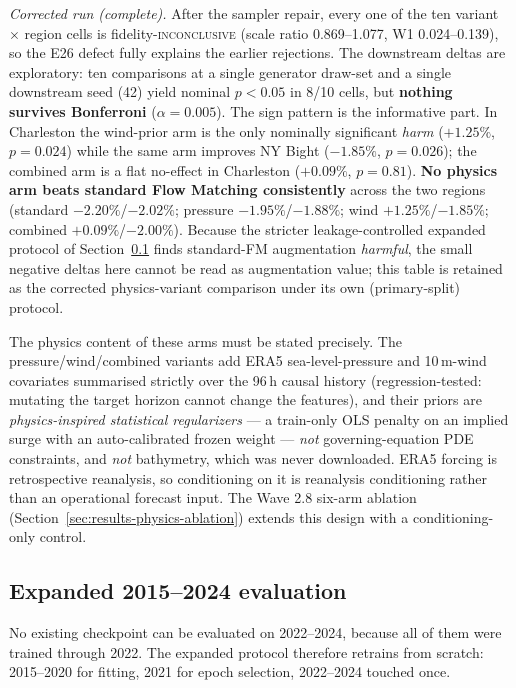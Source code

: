 \emph{Corrected run (complete).} After the sampler repair, every one of the ten
variant $\times$ region cells is fidelity-\textsc{inconclusive} (scale ratio
0.869--1.077, W1 0.024--0.139), so the E26 defect fully explains the earlier
rejections. The downstream deltas are exploratory: ten comparisons at a single
generator draw-set and a single downstream seed (42) yield nominal
$p<0.05$ in 8/10 cells, but \textbf{nothing survives Bonferroni}
($\alpha = 0.005$). The sign pattern is the informative part. In Charleston the
wind-prior arm is the only nominally significant \emph{harm} ($+1.25\%$,
$p=0.024$) while the same arm improves NY Bight ($-1.85\%$, $p=0.026$); the
combined arm is a flat no-effect in Charleston ($+0.09\%$, $p=0.81$).
\textbf{No physics arm beats standard Flow Matching consistently} across the two
regions (standard $-2.20\%$/$-2.02\%$; pressure $-1.95\%$/$-1.88\%$; wind
$+1.25\%$/$-1.85\%$; combined $+0.09\%$/$-2.00\%$). Because the stricter
leakage-controlled expanded protocol of
Section~\ref{sec:results-expanded} finds standard-FM augmentation
\emph{harmful}, the small negative deltas here cannot be read as augmentation
value; this table is retained as the corrected physics-variant comparison under
its own (primary-split) protocol.

The physics content of these arms must be stated precisely. The
pressure/wind/combined variants add ERA5 sea-level-pressure and 10\,m-wind
covariates summarised strictly over the 96\,h causal history (regression-tested:
mutating the target horizon cannot change the features), and their priors are
\emph{physics-inspired statistical regularizers} — a train-only OLS penalty on
an implied surge with an auto-calibrated frozen weight — \emph{not}
governing-equation PDE constraints, and \emph{not} bathymetry, which was never
downloaded. ERA5 forcing is retrospective reanalysis, so conditioning on it is
reanalysis conditioning rather than an operational forecast input. The Wave 2.8
six-arm ablation (Section~\ref{sec:results-physics-ablation}) extends this
design with a conditioning-only control.

\subsection{Expanded 2015--2024 evaluation}
\label{sec:results-expanded}

No existing checkpoint can be evaluated on 2022--2024, because all of them were
trained through 2022. The expanded protocol therefore retrains from scratch:
2015--2020 for fitting, 2021 for epoch selection, 2022--2024 touched once.


